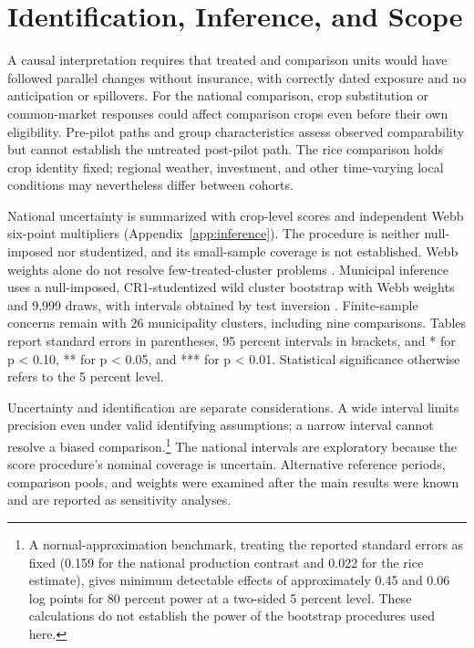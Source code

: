 \section{Identification, Inference, and Scope}\label{sec:identification}

A causal interpretation requires that treated and comparison units would have followed parallel changes without insurance, with correctly dated exposure and no anticipation or spillovers. For the national comparison, crop substitution or common-market responses could affect comparison crops even before their own eligibility. Pre-pilot paths and group characteristics assess observed comparability but cannot establish the untreated post-pilot path. The rice comparison holds crop identity fixed; regional weather, investment, and other time-varying local conditions may nevertheless differ between cohorts.

National uncertainty is summarized with crop-level scores and independent Webb six-point multipliers (Appendix~\ref{app:inference}). The procedure is neither null-imposed nor studentized, and its small-sample coverage is not established. Webb weights alone do not resolve few-treated-cluster problems \citep{mackinnonwebb2018}. Municipal inference uses a null-imposed, CR1-studentized wild cluster bootstrap with Webb weights and 9,999 draws, with intervals obtained by test inversion \citep{cameron2008,webb2023}. Finite-sample concerns remain with 26 municipality clusters, including nine comparisons. Tables report standard errors in parentheses, 95 percent intervals in brackets, and * for p < 0.10, ** for p < 0.05, and *** for p < 0.01. Statistical significance otherwise refers to the 5 percent level.

Uncertainty and identification are separate considerations. A wide interval limits precision even under valid identifying assumptions; a narrow interval cannot resolve a biased comparison.\footnote{A normal-approximation benchmark, treating the reported standard errors as fixed (0.159 for the national production contrast and 0.022 for the rice estimate), gives minimum detectable effects of approximately 0.45 and 0.06 log points for 80 percent power at a two-sided 5 percent level. These calculations do not establish the power of the bootstrap procedures used here.} The national intervals are exploratory because the score procedure's nominal coverage is uncertain. Alternative reference periods, comparison pools, and weights were examined after the main results were known and are reported as sensitivity analyses.
